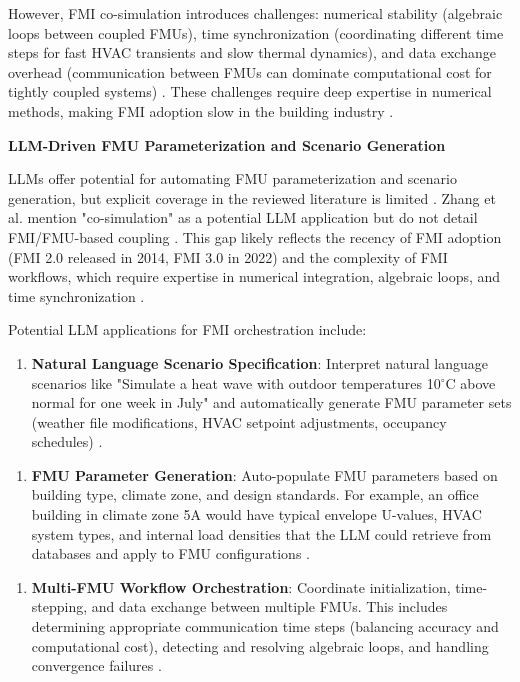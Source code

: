 \documentclass[12pt,a4paper]{article}
\begin{document}
However, FMI co-simulation introduces challenges: numerical stability (algebraic loops between coupled FMUs), time synchronization (coordinating different time steps for fast HVAC transients and slow thermal dynamics), and data exchange overhead (communication between FMUs can dominate computational cost for tightly coupled systems) \cite{ref82}. These challenges require deep expertise in numerical methods, making FMI adoption slow in the building industry \cite{ref83}.

\textbf{LLM-Driven FMU Parameterization and Scenario Generation}

LLMs offer potential for automating FMU parameterization and scenario generation, but explicit coverage in the reviewed literature is limited \cite{ref84}. Zhang et al. mention "co-simulation" as a potential LLM application but do not detail FMI/FMU-based coupling \cite{ref85}. This gap likely reflects the recency of FMI adoption (FMI 2.0 released in 2014, FMI 3.0 in 2022) and the complexity of FMI workflows, which require expertise in numerical integration, algebraic loops, and time synchronization \cite{ref86}.

Potential LLM applications for FMI orchestration include:

\begin{enumerate}
  \item \textbf{Natural Language Scenario Specification}: Interpret natural language scenarios like "Simulate a heat wave with outdoor temperatures 10$^\circ$C above normal for one week in July" and automatically generate FMU parameter sets (weather file modifications, HVAC setpoint adjustments, occupancy schedules) \cite{ref87}.
\end{enumerate}

\begin{enumerate}
  \item \textbf{FMU Parameter Generation}: Auto-populate FMU parameters based on building type, climate zone, and design standards. For example, an office building in climate zone 5A would have typical envelope U-values, HVAC system types, and internal load densities that the LLM could retrieve from databases and apply to FMU configurations \cite{ref88}.
\end{enumerate}

\begin{enumerate}
  \item \textbf{Multi-FMU Workflow Orchestration}: Coordinate initialization, time-stepping, and data exchange between multiple FMUs. This includes determining appropriate communication time steps (balancing accuracy and computational cost), detecting and resolving algebraic loops, and handling convergence failures \cite{ref89}.
\end{enumerate}
\end{document}
